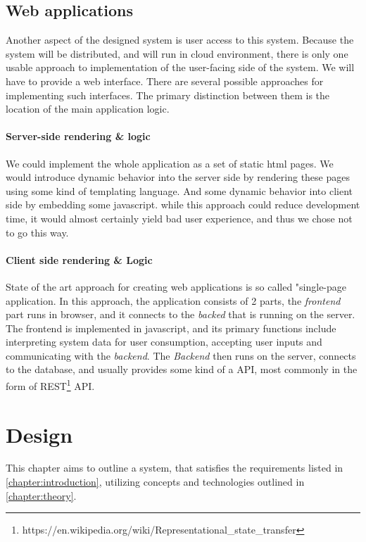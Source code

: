 \section{Web applications}
Another aspect of the designed system is user access to this system. Because the system will be distributed, and will run
in cloud environment, there is only one usable approach to implementation of the user-facing side of the system.
We will have to provide a web interface. There are several possible approaches for implementing such interfaces. The primary
distinction between them is the location of the main application logic.

\subsubsection{Server-side rendering \& logic}
We could implement the whole application as a set of static html pages. We would introduce dynamic behavior into
the server side by rendering these pages using some kind of templating language. And some dynamic behavior
into client side by embedding some javascript. while this approach could reduce development time, it would
almost certainly yield bad user experience, and thus we chose not to go this way.

\subsubsection{Client side rendering \& Logic}
State of the art approach for creating web applications is so called "single-page application. In this approach,
the application consists of 2 parts, the \textit{frontend} part runs in browser, and it connects to the \textit{backed}
that is running on the server. The frontend is implemented in javascript, and its primary functions include interpreting system
data for user consumption, accepting user inputs and communicating with the \textit{backend}. The \textit{Backend} then
runs on the server, connects to the database, and usually provides some kind of a API, most commonly in the form of REST\footnote{https://en.wikipedia.org/wiki/Representational\_state\_transfer} API.

\chapter{Design}
\label{chapter:design}
This chapter aims to outline a system, that satisfies the requirements listed in \autoref{chapter:introduction}, utilizing
concepts and technologies outlined in \autoref{chapter:theory}.

